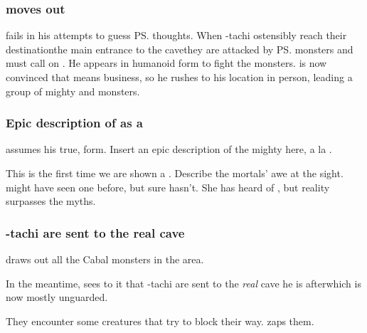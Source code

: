 \subsubsection{\Teshrial{} moves out}
\Teshrial{} fails in his attempts to guess \ps{\Ishnaruchaefir} thoughts. 
When \Shilred-tachi ostensibly reach their destination\dash the main entrance to the cave\dash they are attacked by \ps{\Teshrial} monsters and must call on \Ishnaruchaefir. 
He appears in humanoid form to fight the monsters. 
\Teshrial{} is now convinced that \Ishnaruchaefir{} means business, so he rushes to his location in person, leading a group of mighty \banes{} and monsters. 





\subsubsection{Epic description of \Ishnaruchaefir{} as a \dragon}
\Ishnaruchaefir{} assumes his true, \draconian{} form. Insert an epic description of the mighty \dragon{} here, a la . 

This is the first time we are shown a \dragon. 
Describe the mortals' awe at the sight. 
\Dzasselid{} might have seen one before, but \Shilred{} sure hasn't. 
She has heard  of \dragons{}, but reality surpasses the myths. 





\subsubsection{\Dzasselid-tachi are sent to the real cave}
\Ishnaruchaefir{} draws out all the Cabal monsters in the area. 

In the meantime, \Criseis{} sees to it that \Dzasselid-tachi are sent to the \emph{real} cave he is after\dash which is now mostly unguarded. 

They encounter some creatures that try to block their way. 
\Criseis{} zaps them.


